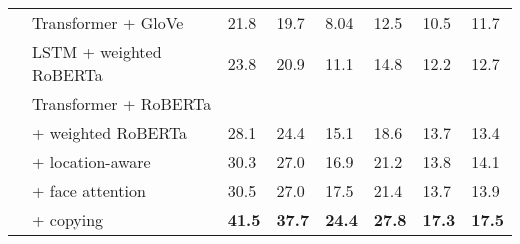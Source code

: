 \documentclass[10pt,twocolumn,letterpaper]{article}
\begin{document}
\begin{table*}[t]
\begin{tabularx}{\textwidth}{llXXXXXX}
      & Transformer + GloVe & 21.8 & 19.7 & 8.04 & 12.5 & 10.5 & 11.7  \\
      & LSTM + weighted RoBERTa & 23.8 & 20.9 & 11.1 & 14.8 & 12.2 & 12.7 \\
      \cmidrule{2-8}
      & Transformer + RoBERTa \\
      & \quad + weighted RoBERTa & 28.1 & 24.4 & 15.1 & 18.6 & 13.7 & 13.4   \\
      & \quad\quad + location-aware & 30.3 & 27.0 & 16.9 & 21.2 & 13.8 & 14.1   \\
      & \quad\quad\quad + face attention & 30.5 & 27.0 & 17.5 & 21.4 & 13.7 & 13.9 \\
      & \quad\quad\quad\quad + copying & \textbf{41.5} & \textbf{37.7} & \textbf{24.4} & \textbf{27.8} & \textbf{17.3} & \textbf{17.5} \\
		\bottomrule
	\end{tabularx}
\end{table*}


{\small


}
\end{document}
